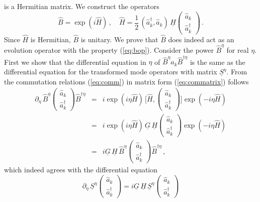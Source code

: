 \documentclass[12pt,amsmath,amssymb]{article}
\numberwithin{equation}{section}
\begin{document}
is a Hermitian matrix. We construct the operators \cite{LeoNeu}
\begin{equation}
\label{eq:ham} \hat{B} = \exp(i\hat{H}) \,,\quad \hat{H} =
\frac{1}{2}\,(\hat{a}_k^\dagger, \hat{a}_k)\, \underline{H} \left(
    \begin{array}{c}
     \hat{a}_k  \\
     \hat{a}_k^\dagger
    \end{array}
\right)
\,.
\end{equation}
Since $\hat{H}$ is Hermitian, $\hat{B}$ is unitary. We prove that
$\hat{B}$ does indeed act as an evolution operator with the
property (\ref{eq:bop}). Consider the power $\hat{B}^\eta$ for
real $\eta$. First we show that the differential equation in
$\eta$ of $\hat{B}^\eta \hat{a}_k \hat{B}^{\dagger\eta}$ is the
same as the differential equation for the transformed mode
operators with matrix $\underline{S}^\eta$. From the commutation
relations (\ref{eq:comm}) in matrix form (\ref{eq:commatrix})
follows
\begin{eqnarray}
\partial_\eta\, \hat{B}^\eta
\left(
    \begin{array}{c}
     \hat{a}_k  \\
     \hat{a}_k^\dagger
    \end{array}
\right) \hat{B}^{\dagger\eta} &=& i\exp(i\eta\hat{H})\,
\big[\hat{H}, \left(
    \begin{array}{c}
     \hat{a}_k  \\
     \hat{a}_k^\dagger
    \end{array}
\right) \big] \exp(-i\eta\hat{H})
\nonumber\\
&=&  i\exp(i\eta\hat{H})\,
 \underline{G}\,\underline{H} \left(
    \begin{array}{c}
     \hat{a}_k  \\
     \hat{a}_k^\dagger
    \end{array}
\right)
\exp(-i\eta\hat{H})
\nonumber\\
&=& i\underline{G}\,\underline{H}\,\hat{B}^\eta \left(
    \begin{array}{c}
     \hat{a}_k  \\
     \hat{a}_k^\dagger
    \end{array}
\right) \hat{B}^{\dagger\eta} \,,
\end{eqnarray}
which indeed agrees with the differential equation
\begin{equation}
\partial_\eta\,
\underline{S}^\eta \left(
    \begin{array}{c}
     \hat{a}_k  \\
     \hat{a}_k^\dagger
    \end{array}
\right) = i\underline{G}\,\underline{H}\,\underline{S}^\eta \left(
    \begin{array}{c}
     \hat{a}_k  \\
     \hat{a}_k^\dagger
    \end{array}
\right)
\end{equation}
\end{document}
